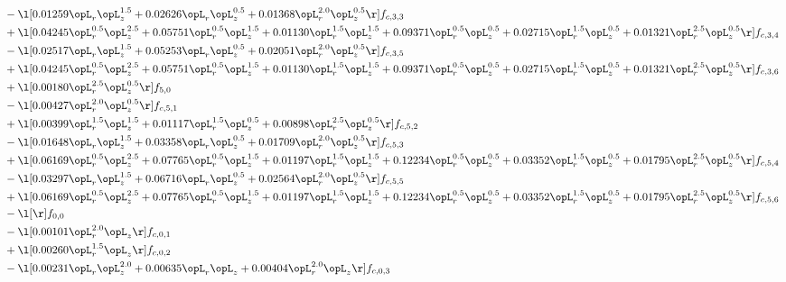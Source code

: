 \begin{alignat}{2}
& - \l[  0.01259 \opL_r \opL_z^{1.5} +  0.02626 \opL_r \opL_z^{0.5} +  0.01368 \opL_r^{2.0} \opL_z^{0.5}  \r] f_{c,3,3} \nonumber \\ 
& + \l[  0.04245 \opL_r^{0.5} \opL_z^{2.5} +  0.05751 \opL_r^{0.5} \opL_z^{1.5} +  0.01130 \opL_r^{1.5} \opL_z^{1.5} +  0.09371 \opL_r^{0.5} \opL_z^{0.5} +  0.02715 \opL_r^{1.5} \opL_z^{0.5} +  0.01321 \opL_r^{2.5} \opL_z^{0.5}  \r] f_{c,3,4} \nonumber \\ 
& - \l[  0.02517 \opL_r \opL_z^{1.5} +  0.05253 \opL_r \opL_z^{0.5} +  0.02051 \opL_r^{2.0} \opL_z^{0.5}  \r] f_{c,3,5} \nonumber \\ 
& + \l[  0.04245 \opL_r^{0.5} \opL_z^{2.5} +  0.05751 \opL_r^{0.5} \opL_z^{1.5} +  0.01130 \opL_r^{1.5} \opL_z^{1.5} +  0.09371 \opL_r^{0.5} \opL_z^{0.5} +  0.02715 \opL_r^{1.5} \opL_z^{0.5} +  0.01321 \opL_r^{2.5} \opL_z^{0.5}  \r] f_{c,3,6} \nonumber \\ 
& + \l[  0.00180 \opL_r^{2.5} \opL_z^{0.5}  \r] f_{5,0} \nonumber \\ 
& - \l[  0.00427 \opL_r^{2.0} \opL_z^{0.5}  \r] f_{c,5,1} \nonumber \\ 
& + \l[  0.00399 \opL_r^{1.5} \opL_z^{1.5} +  0.01117 \opL_r^{1.5} \opL_z^{0.5} +  0.00898 \opL_r^{2.5} \opL_z^{0.5}  \r] f_{c,5,2} \nonumber \\ 
& - \l[  0.01648 \opL_r \opL_z^{1.5} +  0.03358 \opL_r \opL_z^{0.5} +  0.01709 \opL_r^{2.0} \opL_z^{0.5}  \r] f_{c,5,3} \nonumber \\ 
& + \l[  0.06169 \opL_r^{0.5} \opL_z^{2.5} +  0.07765 \opL_r^{0.5} \opL_z^{1.5} +  0.01197 \opL_r^{1.5} \opL_z^{1.5} +  0.12234 \opL_r^{0.5} \opL_z^{0.5} +  0.03352 \opL_r^{1.5} \opL_z^{0.5} +  0.01795 \opL_r^{2.5} \opL_z^{0.5}  \r] f_{c,5,4} \nonumber \\ 
& - \l[  0.03297 \opL_r \opL_z^{1.5} +  0.06716 \opL_r \opL_z^{0.5} +  0.02564 \opL_r^{2.0} \opL_z^{0.5}  \r] f_{c,5,5} \nonumber \\ 
& + \l[  0.06169 \opL_r^{0.5} \opL_z^{2.5} +  0.07765 \opL_r^{0.5} \opL_z^{1.5} +  0.01197 \opL_r^{1.5} \opL_z^{1.5} +  0.12234 \opL_r^{0.5} \opL_z^{0.5} +  0.03352 \opL_r^{1.5} \opL_z^{0.5} +  0.01795 \opL_r^{2.5} \opL_z^{0.5}  \r] f_{c,5,6} \nonumber \\ 
& - \l[  \r] f_{0,0} \nonumber \\ 
& - \l[  0.00101 \opL_r^{2.0} \opL_z  \r] f_{c,0,1} \nonumber \\ 
& + \l[  0.00260 \opL_r^{1.5} \opL_z  \r] f_{c,0,2} \nonumber \\ 
& - \l[  0.00231 \opL_r \opL_z^{2.0} +  0.00635 \opL_r \opL_z +  0.00404 \opL_r^{2.0} \opL_z  \r] f_{c,0,3} \nonumber \\ 

\end{alignat}
